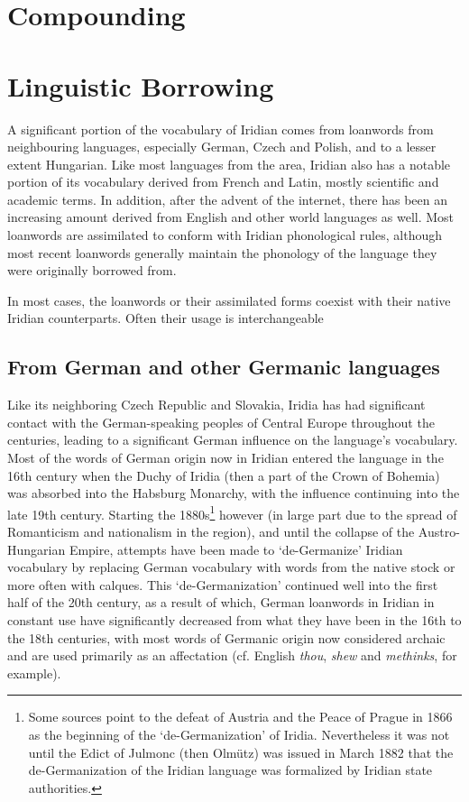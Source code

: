 \section{Compounding}\label{sec:compounding}

\section{Linguistic Borrowing}
A significant portion of the vocabulary of Iridian comes from loanwords from neighbouring languages, especially German, Czech and Polish, and to a lesser extent Hungarian. Like most languages from the area, Iridian also has a notable portion of its vocabulary derived from French and Latin, mostly scientific and academic terms. In addition, after the advent of the internet, there has been an increasing amount derived from English and other world languages as well. Most loanwords are assimilated to conform with Iridian phonological rules, although most recent loanwords generally maintain the phonology of the language they were originally borrowed from.

In most cases, the loanwords or their assimilated forms coexist with their native Iridian counterparts. Often their usage is interchangeable

\subsection{From German and other Germanic languages}

Like its neighboring Czech Republic and Slovakia, Iridia has had significant contact with the German-speaking peoples of Central Europe throughout the centuries, leading to a significant German influence on the language's vocabulary. Most of the words of German origin now in Iridian entered the language in the 16th century when the Duchy of Iridia (then a part of the Crown of Bohemia) was absorbed into the Habsburg Monarchy, with the influence continuing into the late 19th century. Starting the 1880s\footnote{Some sources point to the defeat of Austria and the Peace of Prague in 1866 as the beginning of the `de-Germanization' of Iridia. Nevertheless it was not until the Edict of Julmonc (then Olm\"utz) was issued in March 1882 that the de-Germanization of the Iridian language was formalized by Iridian state authorities.} however (in large part due to the spread of Romanticism and nationalism in the region), and until the collapse of the Austro-Hungarian Empire, attempts have been made to `de-Germanize' Iridian vocabulary by replacing German vocabulary with words from the native stock or more often with calques. This `de-Germanization' continued well into the first half of the 20th century, as a result of which, German loanwords in Iridian in constant use have significantly decreased from what they have been in the 16th to the 18th centuries, with most words of Germanic origin now considered archaic and are used primarily as an affectation (cf. English \emph{thou}, \emph{shew} and \emph{methinks}, for example).

